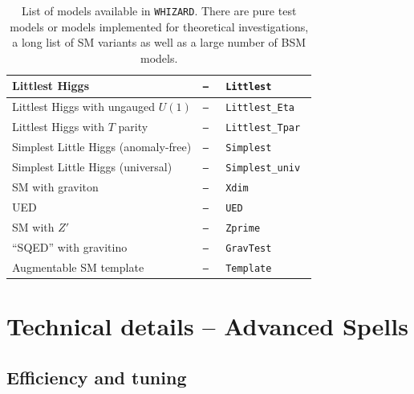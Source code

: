 \documentclass[12pt]{book}
\newcommand{\whizard}{\texttt{WHIZARD}}
\begin{document}
\begin{table}
\begin{center}
\begin{tabular}{|l|l|l|}
             \hline
             Littlest Higgs &  \tt{---} & \tt{Littlest} \\
             \hline
             Littlest Higgs with ungauged $U(1)$ &  \tt{---} &
             \tt{Littlest\_Eta} \\
             \hline
             Littlest Higgs with $T$ parity &  \tt{---} &
             \tt{Littlest\_Tpar} \\
             \hline
             Simplest Little Higgs (anomaly-free) &  \tt{---} &
             \tt{Simplest} \\
             \hline
             Simplest Little Higgs (universal) &  \tt{---} &
             \tt{Simplest\_univ} \\
             \hline
             SM with graviton & \tt{---} & \tt{Xdim} \\
             \hline
             UED & \tt{---} & \tt{UED} \\
             \hline
             SM with $Z'$ & \tt{---} & \tt{Zprime} \\
             \hline
             ``SQED'' with gravitino & \tt{---} & \tt{GravTest} \\
             \hline
             Augmentable SM template & \tt{---} & \tt{Template} \\
             \hline
           \end{tabular}
         \end{center}
	\caption{\label{tab:models} List of models available in
          \whizard. There are pure test models or models implemented 
          for theoretical investigations, a long list of SM variants
          as well as a large number of BSM models.}
\end{table}


\chapter{Technical details -- Advanced Spells}

\section{Efficiency and tuning}
\end{document}
